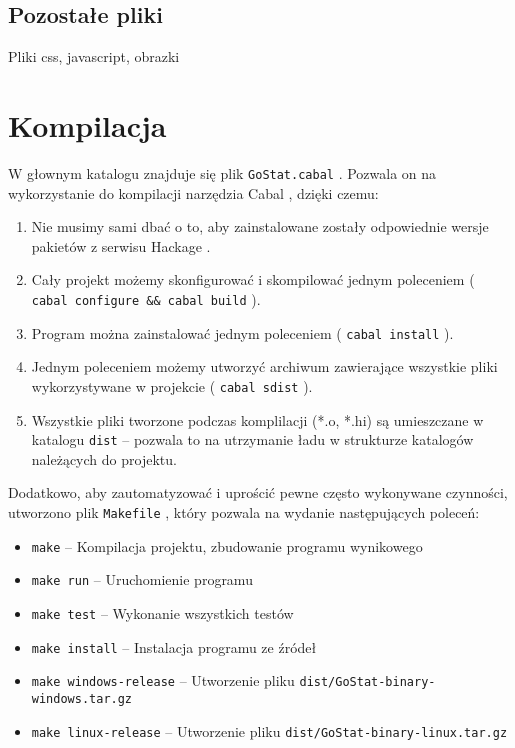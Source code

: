 \documentclass[10pt,leqno]{article}
\newcommand{\cmd}[1]{
  \texttt{#1}
}
\begin{document}
\subsection{Pozostałe pliki}
Pliki css, javascript, obrazki

\newpage

\section{Kompilacja}

W głownym katalogu znajduje się plik \cmd{GoStat.cabal}. Pozwala on na wykorzystanie do kompilacji 
narzędzia Cabal \cite{cabal}, dzięki czemu:

\begin{enumerate}
\item Nie musimy sami dbać o to, aby zainstalowane zostały odpowiednie wersje pakietów z serwisu
  Hackage \cite{hackage}.
\item Cały projekt możemy skonfigurować i skompilować jednym poleceniem (\cmd{cabal configure \&\& cabal build}).
\item Program można zainstalować jednym poleceniem (\cmd{cabal install}).
\item Jednym poleceniem możemy utworzyć archiwum zawierające wszystkie pliki wykorzystywane w projekcie (\cmd{cabal sdist}).
\item Wszystkie pliki tworzone podczas komplilacji (*.o, *.hi) są umieszczane w katalogu \cmd{dist} -- pozwala
  to na utrzymanie ładu w strukturze katalogów należących do projektu.
\end{enumerate}

\noindent Dodatkowo, aby zautomatyzować i uprościć pewne często wykonywane czynności, utworzono plik \cmd{Makefile}, który
pozwala na wydanie następujących poleceń:

\begin{itemize}

\item \cmd{make} -- Kompilacja projektu, zbudowanie programu wynikowego
\item \cmd{make run} -- Uruchomienie programu
\item \cmd{make test} -- Wykonanie wszystkich testów
\item \cmd{make install} -- Instalacja programu ze źródeł
\item \cmd{make windows-release} -- Utworzenie pliku \cmd{dist/GoStat-binary-windows.tar.gz}
\item \cmd{make linux-release}   -- Utworzenie pliku \cmd{dist/GoStat-binary-linux.tar.gz}
\end{itemize}
\end{document}
